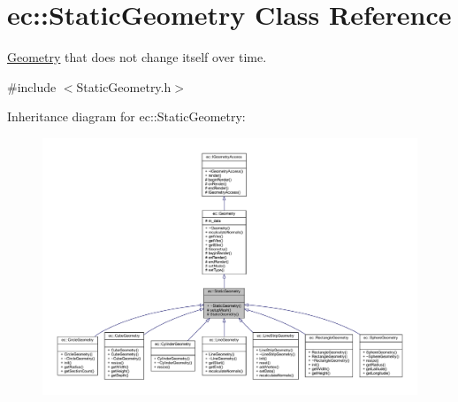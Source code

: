 \hypertarget{classec_1_1_static_geometry}{}\section{ec\+:\+:Static\+Geometry Class Reference}
\label{classec_1_1_static_geometry}


\mbox{\hyperlink{classec_1_1_geometry}{Geometry}} that does not change itself over time.  




{\ttfamily \#include $<$Static\+Geometry.\+h$>$}



Inheritance diagram for ec\+:\+:Static\+Geometry\+:\nopagebreak
\begin{figure}[H]
\begin{center}
\leavevmode
\includegraphics[width=350pt]{classec_1_1_static_geometry__inherit__graph}
\end{center}
\end{figure}


